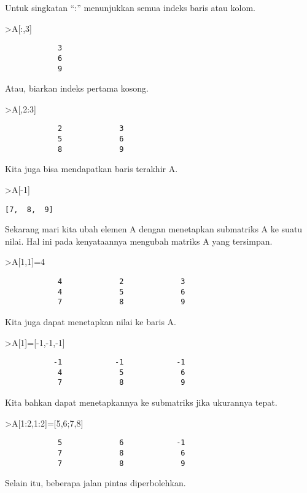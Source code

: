 \documentclass[
]{book}
\begin{document}
Untuk singkatan ``:'' menunjukkan semua indeks baris atau kolom.

\textgreater A{[}:,3{]}

\begin{verbatim}
            3 
            6 
            9 
\end{verbatim}

Atau, biarkan indeks pertama kosong.

\textgreater A{[},2:3{]}

\begin{verbatim}
            2             3 
            5             6 
            8             9 
\end{verbatim}

Kita juga bisa mendapatkan baris terakhir A.

\textgreater A{[}-1{]}

\begin{verbatim}
[7,  8,  9]
\end{verbatim}

Sekarang mari kita ubah elemen A dengan menetapkan submatriks A ke suatu nilai. Hal ini pada kenyataannya mengubah matriks A yang tersimpan.

\textgreater A{[}1,1{]}=4

\begin{verbatim}
            4             2             3 
            4             5             6 
            7             8             9 
\end{verbatim}

Kita juga dapat menetapkan nilai ke baris A.

\textgreater A{[}1{]}={[}-1,-1,-1{]}

\begin{verbatim}
           -1            -1            -1 
            4             5             6 
            7             8             9 
\end{verbatim}

Kita bahkan dapat menetapkannya ke submatriks jika ukurannya tepat.

\textgreater A{[}1:2,1:2{]}={[}5,6;7,8{]}

\begin{verbatim}
            5             6            -1 
            7             8             6 
            7             8             9 
\end{verbatim}

Selain itu, beberapa jalan pintas diperbolehkan.
\end{document}
